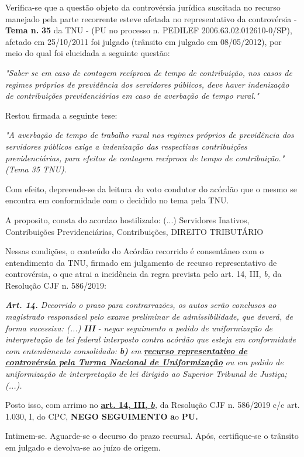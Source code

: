 \documentclass[12pt]{article}
\begin{document}
\justifying
\noindent Verifica-se que a questão objeto da controvérsia jurídica suscitada no recurso manejado pela parte recorrente esteve afetada no representativo da controvérsia - \textbf{Tema n. }\textbf{35} da TNU - (PU no processo n. PEDILEF 2006.63.02.012610-0/SP),  afetado em 25/10/2011 foi julgado (trânsito em julgado em 08/05/2012), por meio do qual foi elucidada a seguinte questão:

\noindent \textit{"Saber se em caso de contagem recíproca de tempo de contribuição, nos casos de regimes próprios de previdência dos servidores públicos, deve haver indenização de contribuições previdenciárias em caso de averbação de tempo rural."}

\noindent Restou firmada a seguinte tese:

\noindent \textit{"A averbação de tempo de trabalho rural nos regimes próprios de previdência dos servidores públicos exige a indenização das respectivas contribuições previdenciárias, para efeitos de contagem recíproca de tempo de contribuição." (Tema 35 TNU).}

\noindent Com efeito, depreende-se da leitura do voto condutor do acórdão que o mesmo se encontra em conformidade com o decidido no  tema pela TNU.

\noindent A proposito, consta do acordao hostilizado: (...) Servidores Inativos, Contribuições Previdenciárias, Contribuições, DIREITO TRIBUTÁRIO

\noindent Nessas condições, o conteúdo do Acórdão recorrido é consentâneo com o entendimento da TNU, firmado em julgamento de recurso representativo de controvérsia, o que atrai a incidência da regra prevista pelo art. 14, III, \textit{b,} da Resolução CJF n. 586/2019:

\noindent \textit{\textbf{Art. 14.}}\textit{ Decorrido o prazo para contrarrazões, os autos serão conclusos ao magistrado responsável pelo exame preliminar de admissibilidade, que deverá, de forma sucessiva: (...) }\textit{\textbf{III }}\textit{- negar seguimento a pedido de uniformização de interpretação de lei federal interposto contra acórdão que esteja em conformidade com entendimento consolidado: }\textit{\textbf{b)}}\textit{ em }\uline{\textit{\textbf{recurso representativo de controvérsia pela Turma Nacional de Uniformização}}}\textit{ ou em pedido de uniformização de interpretação de lei dirigido ao Superior Tribunal de Justiça;(...).}

\noindent Posto isso, com arrimo no \uline{\textbf{art. 14, III, }}\uline{\textit{\textbf{b}}}\textit{,} da Resolução CJF n. 586/2019 c/c art. 1.030, I, do CPC, \textbf{NEGO SEGUIMENTO }\textbf{a}o\textbf{ PU}\textbf{.}

\noindent Intimem-se. Aguarde-se o decurso do prazo recursal. Após, certifique-se o trânsito em julgado e devolva-se ao juízo de origem.
\end{document}
